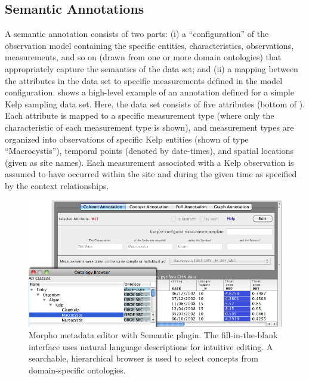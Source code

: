 \subsection{Semantic Annotations} 

A semantic annotation consists of two parts: (i) a ``configuration''
of the observation model containing the specific entities,
characteristics, observations, measurements, and so on (drawn from one
or more domain ontologies) that appropriately capture the semantics of
the data set; and (ii) a mapping between the attributes in the data
set to specific measurements defined in the model
configuration.  shows a high-level example
of an annotation defined for a simple Kelp sampling data set. Here,
the data set consists of five attributes (bottom of
). Each attribute is mapped to a specific
measurement type (where only the characteristic of each measurement
type is shown), and measurement types are organized into observations
of specific Kelp entities (shown of type ``Macrocystis''), temporal
points (denoted by date-times), and spatial locations (given as site
names). Each measurement associated with a Kelp observation is assumed
to have occurred within the site and during the given time as
specified by the context relationships.

\begin{figure}[!t]
\centering
\includegraphics[width=1.0\textwidth]{images/morpho-annotation-widget.png}
\caption{Morpho metadata editor with Semantic
  plugin. The fill-in-the-blank interface uses
  natural language descriptions for intuitive editing. A searchable, hierarchical browser is
  used to select concepts from domain-specific ontologies.}
\label{fig:morpho-annotation}
\end{figure}


